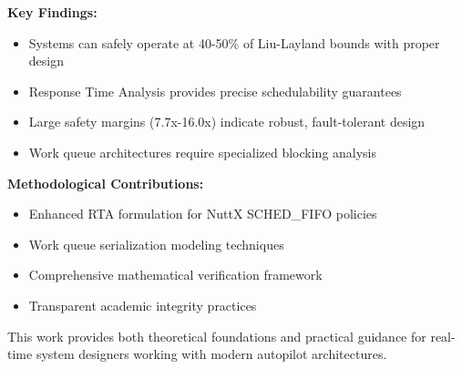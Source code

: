 \documentclass[12pt,a4paper]{article}
\begin{document}
\textbf{Key Findings:}
\begin{itemize}
\item Systems can safely operate at 40-50\% of Liu-Layland bounds with proper design
\item Response Time Analysis provides precise schedulability guarantees
\item Large safety margins (7.7x-16.0x) indicate robust, fault-tolerant design
\item Work queue architectures require specialized blocking analysis
\end{itemize}

\textbf{Methodological Contributions:}
\begin{itemize}
\item Enhanced RTA formulation for NuttX SCHED\_FIFO policies
\item Work queue serialization modeling techniques
\item Comprehensive mathematical verification framework
\item Transparent academic integrity practices
\end{itemize}

This work provides both theoretical foundations and practical guidance for real-time system designers working with modern autopilot architectures.
\end{document}
